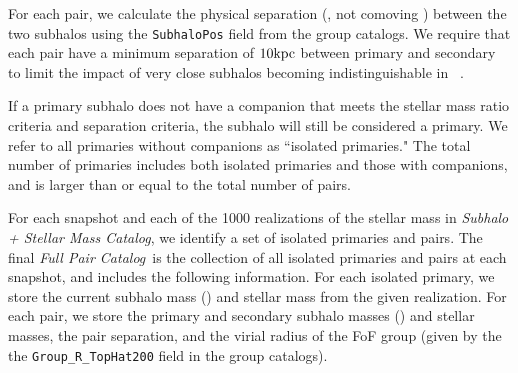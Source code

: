 \documentclass[twocolumn]{aastex631}
\newcommand{\starcat}{\textit{Subhalo + Stellar Mass Catalog}}
\newcommand{\paircat}{\textit{Full Pair Catalog}}
\begin{document}
        For each pair, we calculate the physical separation (\kpc, not comoving \kpc) between the two subhalos using the \texttt{SubhaloPos} field from the group catalogs. We require that each pair have a minimum separation of $10 \mathrm{kpc}$ between primary and secondary to limit the impact of very close subhalos becoming indistinguishable in \subfind~\citep{rg17}.

        If a primary subhalo does not have a companion that meets the stellar mass ratio criteria and separation criteria, the subhalo will still be considered a primary. 
        We refer to all primaries without companions as ``isolated primaries."
        The total number of primaries includes both isolated primaries and those with companions, and is larger than or equal to the total number of pairs.

        For each snapshot and each of the 1000 realizations of the stellar mass in \starcat, we identify a set of isolated primaries and pairs. 
        The final \paircat\ is the collection of all isolated primaries and pairs at each snapshot, and includes the following information. 
        For each isolated primary, we store the current subhalo mass (\Mhalo) and stellar mass from the given realization. 
        For each pair, we store the primary and secondary subhalo masses (\Mhalo) and stellar masses, the pair separation, and the virial radius of the FoF group (given by the  the \texttt{Group\_R\_TopHat200} field in the group catalogs). 
        

\end{document}
